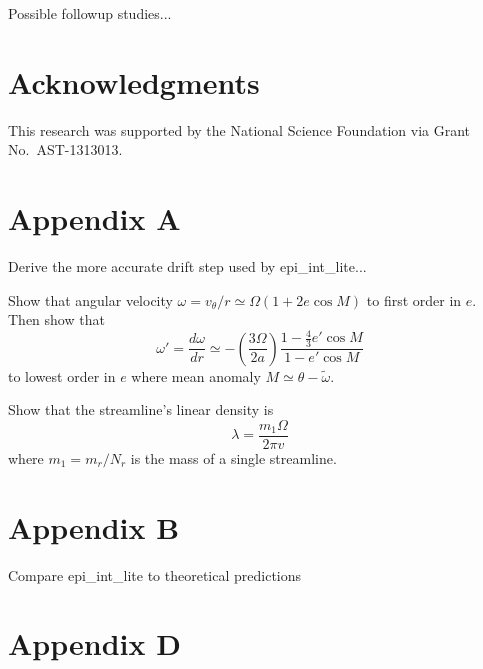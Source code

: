 \documentclass[preprint]{aastex62}
\begin{document}
Possible followup studies...

\acknowledgments
\section{Acknowledgments}
\label{sec:Acknowledgments}

This research was supported by the National Science Foundation via Grant No.\ AST-1313013.


\appendix

\section{Appendix A}
\label{sec:Appendix A}

Derive the more accurate drift step used by epi\_int\_lite...

Show that angular velocity $\omega=v_\theta/r\simeq\Omega(1+2e\cos M)$ to
first order in $e$. Then show that
\begin{equation}
    \label{eqn:domega-dr}
    \omega' = \frac{d\omega}{dr} \simeq -\left(\frac{3\Omega}{2a}\right)
        \frac{1-\frac{4}{3}e'\cos M}{1-e'\cos M}
\end{equation}
to lowest order in $e$ where mean anomaly $M\simeq\theta-\tilde{\omega}$.

Show that the streamline's linear density is
\begin{equation}
    \label{eqn:lambda}
    \lambda = \frac{m_1\Omega}{2\pi v}
\end{equation}
where $m_1 = m_r/N_r$ is the mass of a single streamline.

\section{Appendix B}
\label{sec:Appendix B}

Compare epi\_int\_lite to theoretical predictions

\section{Appendix D}
\label{sec:Appendix D}
\end{document}
